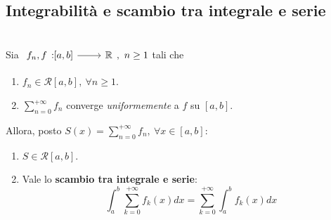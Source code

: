 \subsection{Integrabilità e scambio tra integrale e serie}
\begin{theorema}~{}\\
	Sia $\funz{f_n,f}{\left[a,b\right]}{\realset},\ n\geq 1$ tali che
	\begin{enumerate}
		\item $f_n\in\mathcal{R}\left[a,b\right],\ \forall n\geq 1$.
		\item $\displaystyle\sum_{n=0}^{+\infty}f_n$ converge \textit{uniformemente} a $f$ su $\left[a,b\right]$.
	\end{enumerate}
	Allora, posto $\displaystyle S\left(x\right)=\sum_{n=0}^{+\infty}f_n,\ \forall x\in \left[a,b\right]$:
	\begin{enumerate}
		\item $S\in\mathcal{R}\left[a,b\right]$.
		\item Vale lo \textbf{scambio tra integrale e serie}:
		\begin{equation}
			\int_{a}^{b}\sum_{k=0}^{+\infty}f_k\left(x\right)dx=\sum_{k=0}^{+\infty}\int_{a}^{b}f_k\left(x\right)dx
		\end{equation}
	\end{enumerate}
\end{theorema}
